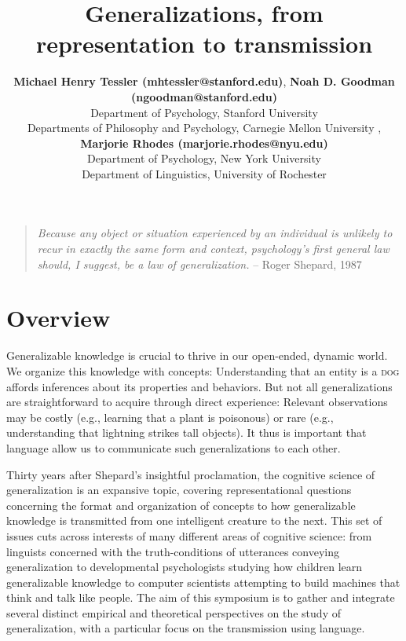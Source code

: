 \documentclass[10pt,letterpaper]{article}
\title{Generalizations, from representation to transmission}
\author{{\large \bf Michael Henry Tessler (mhtessler@stanford.edu)}, {\large \bf Noah D. Goodman (ngoodman@stanford.edu)}  \\
  Department of Psychology, Stanford University \vspace{-0.1cm}
   \AND {\large \bf David Danks (ddanks@cmu.edu)} \\
  Departments of Philosophy and Psychology, Carnegie Mellon University \vspace{-0.1cm}
    \AND{\large \bf Emily Foster-Hanson (emily.fosterhanson@nyu.edu)}, {\large \bf Marjorie Rhodes (marjorie.rhodes@nyu.edu)} \\
  Department of Psychology, New York University \vspace{-0.1cm}
    \AND {\large \bf Gregory Carlson (calrson@ling.rochester.edu)} \\
  Department of Linguistics, University of Rochester \vspace{-0.1cm}
  }
\begin{document}
\maketitle



\begin{quote}
\footnotesize
\emph{Because any object or situation experienced by an individual is unlikely to recur in exactly the same form and context, psychology's first general law should, I suggest, be a law of generalization.}  -- Roger Shepard, 1987
\end{quote}
\section{Overview}

Generalizable knowledge is crucial to thrive in our open-ended, dynamic world. 
We organize this knowledge with concepts: Understanding that an entity is a \textsc{dog} affords inferences about its properties and behaviors. 
But not all generalizations are straightforward to acquire through direct experience: Relevant observations may be costly (e.g., learning that a plant is poisonous) or rare (e.g., understanding that lightning strikes tall objects). 
It thus is important that language allow us to communicate such generalizations to each other. 

Thirty years after Shepard's insightful proclamation, the cognitive science of generalization is an expansive topic, covering representational questions concerning the format and organization of concepts to how generalizable knowledge is transmitted from one intelligent creature to the next.
This set of issues cuts across interests of many different areas of cognitive science: from linguists concerned with the truth-conditions of utterances conveying generalization to developmental psychologists studying how children learn generalizable knowledge to computer scientists attempting to build machines that think and talk like people. 
The aim of this symposium is to gather and integrate several distinct empirical and theoretical perspectives on the study of generalization, with a particular focus on the transmission using language.
\end{document}
